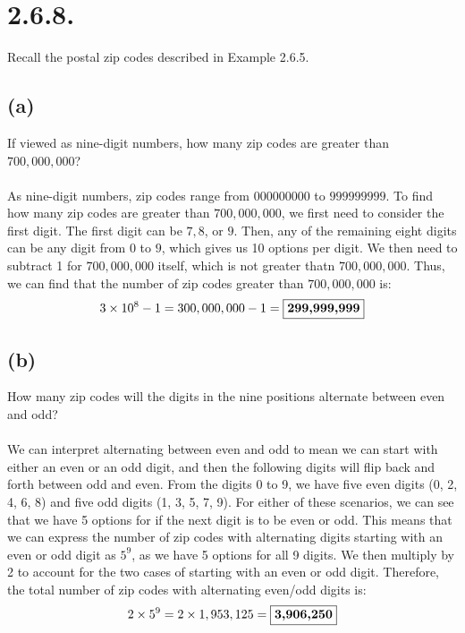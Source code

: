 \documentclass{article}
\begin{document}
\thispagestyle{firstpageheader}
{\Large 

\section*{2.6.8.} 
Recall the postal zip codes described in Example 2.6.5.

\subsection*{(a)} 
If viewed as nine-digit numbers, how many zip codes are greater than \(700,000,000\)?
\\
\\
As nine-digit numbers, zip codes range from \(000000000\) to \(999999999\). To find how many zip codes are greater than \(700,000,000\), we first need to consider the first digit. The first digit can be \(7, 8\), or \(9\). Then, any of the remaining eight digits can be any digit from \(0\) to \(9\), which gives us 10 options per digit. We then need to subtract 1 for \(700,000,000\) itself, which is not greater thatn \(700,000,000\). Thus, we can find that the number of zip codes greater than \(700,000,000\) is:
\[
3 \times 10^8 - 1 = 300,000,000 - 1 = \fbox{\textbf{299,999,999}}
\]

\subsection*{(b)} 
How many zip codes will the digits in the nine positions alternate between even and odd?
\\ \\ 
We can interpret alternating between even and odd to mean we can start with either an even or an odd digit, and then the following digits will flip back and forth between odd and even. From the digits 0 to 9, we have five even digits (0, 2, 4, 6, 8) and five odd digits (1, 3, 5, 7, 9). For either of these scenarios, we can see that we have 5 options for if the next digit is to be even or odd. This means that we can express the number of zip codes with alternating digits starting with an even or odd digit as \(5^9\), as we have 5 options for all 9 digits. We then multiply by 2 to account for the two cases of starting with an even or odd digit. Therefore, the total number of zip codes with alternating even/odd digits is:
\[
2 \times 5^9 = 2 \times 1,953,125 = \fbox{\textbf{3,906,250}}
\]

}
\end{document}
